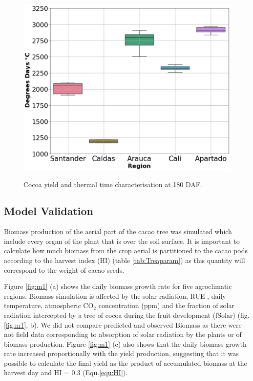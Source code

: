 \documentclass[gene,journal,article,submit,moreauthors,pdftex]{Definitions/mdpi}
\begin{document}
\begin{figure}[h!]
	\centering
	\includegraphics[scale=0.2]{images/ttbbox.png}\\
	\caption{\footnotesize {Cocoa yield and thermal time characterisation at 180 DAF.\\}}
	\label{fig:ttbox}
\end{figure}



\subsection{Model Validation}

Biomass production of the aerial part of the cacao tree was simulated which include every organ of the plant that is over the soil surface. It is important to calculate how much biomass from the crop aerial is partitioned to the cacao pods according to the harvest index (HI) (table \ref{tab:Treaparam}) as this quantity will correspond to the weight of cacao seeds.  

Figure \ref{fig:m1} (a) shows the daily biomass growth rate for five agroclimatic regions. Biomass simulation is affected by the solar radiation, RUE \citep{Fletcher2013RUE,Bonhomme2000}, daily temperature, atmospheric CO$_{2}$ concentration (ppm) and the fraction of solar radiation intercepted by a tree of cocoa during the fruit development (fSolar) (fig. \ref{fig:m1}, b). We did not compare predicted and observed Biomass as there were not field data corresponding to absorption of solar radiation by the plants or of biomass production. Figure \ref{fig:m1} (c) also shows that the daily biomass growth rate increased proportionally with the yield production, suggesting that it was possible to calculate the final yield as the product of accumulated biomass at the harvest day and HI = 0.3 (Equ.\ref{equ:HI}).
\end{document}
